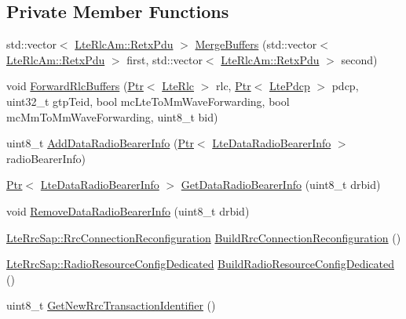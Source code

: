 \subsection*{Private Member Functions}
\begin{DoxyCompactItemize}
\item 
std\+::vector$<$ \hyperlink{structns3_1_1LteRlcAm_1_1RetxPdu}{Lte\+Rlc\+Am\+::\+Retx\+Pdu} $>$ \hyperlink{classns3_1_1UeManager_aa35d9d1c4f3019583f782373d9e428a1}{Merge\+Buffers} (std\+::vector$<$ \hyperlink{structns3_1_1LteRlcAm_1_1RetxPdu}{Lte\+Rlc\+Am\+::\+Retx\+Pdu} $>$ first, std\+::vector$<$ \hyperlink{structns3_1_1LteRlcAm_1_1RetxPdu}{Lte\+Rlc\+Am\+::\+Retx\+Pdu} $>$ second)
\item 
void \hyperlink{classns3_1_1UeManager_acfe070a93481248c1d2624f02a448a34}{Forward\+Rlc\+Buffers} (\hyperlink{classns3_1_1Ptr}{Ptr}$<$ \hyperlink{classns3_1_1LteRlc}{Lte\+Rlc} $>$ rlc, \hyperlink{classns3_1_1Ptr}{Ptr}$<$ \hyperlink{classns3_1_1LtePdcp}{Lte\+Pdcp} $>$ pdcp, uint32\+\_\+t gtp\+Teid, bool mc\+Lte\+To\+Mm\+Wave\+Forwarding, bool mc\+Mm\+To\+Mm\+Wave\+Forwarding, uint8\+\_\+t bid)
\item 
uint8\+\_\+t \hyperlink{classns3_1_1UeManager_a445cf5c9036a101af33526a4ebb89863}{Add\+Data\+Radio\+Bearer\+Info} (\hyperlink{classns3_1_1Ptr}{Ptr}$<$ \hyperlink{classns3_1_1LteDataRadioBearerInfo}{Lte\+Data\+Radio\+Bearer\+Info} $>$ radio\+Bearer\+Info)
\item 
\hyperlink{classns3_1_1Ptr}{Ptr}$<$ \hyperlink{classns3_1_1LteDataRadioBearerInfo}{Lte\+Data\+Radio\+Bearer\+Info} $>$ \hyperlink{classns3_1_1UeManager_a8f8a1bcd11bcdfd6e17b72c6325a25b0}{Get\+Data\+Radio\+Bearer\+Info} (uint8\+\_\+t drbid)
\item 
void \hyperlink{classns3_1_1UeManager_a73a1be128d8e48154fcb9a9ef3c742ec}{Remove\+Data\+Radio\+Bearer\+Info} (uint8\+\_\+t drbid)
\item 
\hyperlink{structns3_1_1LteRrcSap_1_1RrcConnectionReconfiguration}{Lte\+Rrc\+Sap\+::\+Rrc\+Connection\+Reconfiguration} \hyperlink{classns3_1_1UeManager_a41bd82649d9703e339e3fe988f922a5f}{Build\+Rrc\+Connection\+Reconfiguration} ()
\item 
\hyperlink{structns3_1_1LteRrcSap_1_1RadioResourceConfigDedicated}{Lte\+Rrc\+Sap\+::\+Radio\+Resource\+Config\+Dedicated} \hyperlink{classns3_1_1UeManager_ad5933233e726bf7443714ecb261358f0}{Build\+Radio\+Resource\+Config\+Dedicated} ()
\item 
uint8\+\_\+t \hyperlink{classns3_1_1UeManager_a87e1b280b80dbd9e1aa0f91994882057}{Get\+New\+Rrc\+Transaction\+Identifier} ()

\end{DoxyCompactItemize}
